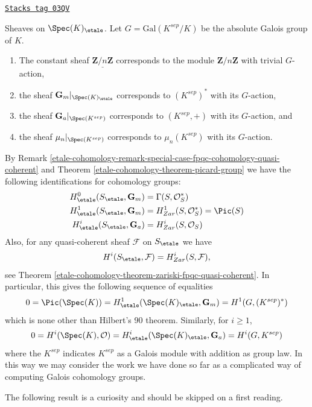 \begin{example}
\label{etale-cohomology-example-sheaves-point}
\href{https://stacks.math.columbia.edu/tag/03QV}{\texttt{Stacks tag 03QV}}

Sheaves on $\Spec(K)_\etale$.
Let $G = \text{Gal}(K^{sep}/K)$ be the absolute Galois group of $K$.
\begin{enumerate}
\item The constant sheaf $\underline{\mathbf{Z}/n\mathbf{Z}}$ corresponds to
the module $\mathbf{Z}/n\mathbf{Z}$ with trivial $G$-action,
\item the sheaf $\mathbf{G}_m|_{\Spec(K)_\etale}$ corresponds to
$(K^{sep})^*$ with its $G$-action,
\item the sheaf $\mathbf{G}_a|_{\Spec(K^{sep})}$ corresponds to
$(K^{sep}, +)$ with its $G$-action, and
\item the sheaf $\mu_n|_{\Spec(K^{sep})}$ corresponds to
$\mu_n(K^{sep})$ with its $G$-action.
\end{enumerate}
By
Remark \ref{etale-cohomology-remark-special-case-fpqc-cohomology-quasi-coherent}
and
Theorem \ref{etale-cohomology-theorem-picard-group}
we have the following identifications for cohomology groups:
\begin{align*}
H_\etale^0(S_\etale, \mathbf{G}_m) & =
\Gamma(S, \mathcal{O}_S^*) \\
H_\etale^1(S_\etale, \mathbf{G}_m) & =
H_{Zar}^1(S, \mathcal{O}_S^*) = \Pic(S) \\
H_\etale^i(S_\etale, \mathbf{G}_a) & =
H_{Zar}^i(S, \mathcal{O}_S)
\end{align*}
Also, for any quasi-coherent sheaf $\mathcal{F}$ on $S_\etale$ we have
$$
H^i(S_\etale, \mathcal{F}) = H_{Zar}^i(S, \mathcal{F}),
$$
see
Theorem \ref{etale-cohomology-theorem-zariski-fpqc-quasi-coherent}.
In particular, this gives the following sequence of equalities
$$
0 =
\Pic(\Spec(K)) =
H_\etale^1(\Spec(K)_\etale, \mathbf{G}_m) =
H^1(G, (K^{sep})^*)
$$
which is none other than Hilbert's 90 theorem. Similarly, for $i \geq 1$,
$$
0 = H^i(\Spec(K), \mathcal{O})
= H_\etale^i(\Spec(K)_\etale, \mathbf{G}_a)
= H^i(G, K^{sep})
$$
where the $K^{sep}$ indicates $K^{sep}$ as a Galois module with addition
as group law. In this way we may consider the work we have done so far as
a complicated way of computing Galois cohomology groups.
\end{example}

The following result is a curiosity and should be skipped on a
first reading.

